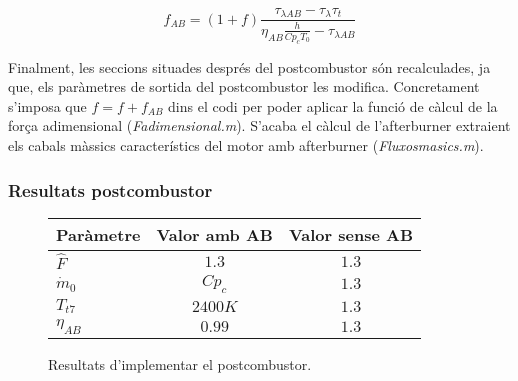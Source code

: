 \begin{equation}
	f_{AB}=(1+f)\frac{\tau_{\lambda AB}-\tau_{\lambda}\tau_t}{\eta_{AB}\frac{h}{Cp_cT_0}-\tau_{\lambda AB}}
\end{equation}
 
 
\noindent Finalment, les seccions situades després del postcombustor són recalculades, ja que, els paràmetres de sortida del postcombustor les modifica. Concretament s'imposa que $f = f +f_{AB}$ dins el codi per poder aplicar la funció de càlcul de la força adimensional (\textit{Fadimensional.m}). S'acaba el càlcul de l'afterburner extraient els cabals màssics característics del motor amb afterburner (\textit{Fluxosmasics.m}).

\subsubsection{Resultats postcombustor}
\begin{figure}[H]
	\centering
	\begin{tabular}{lcc}
		\toprule[3pt]
		\textbf{Paràmetre}&\textbf{Valor amb AB}&\textbf{Valor sense AB}\\
		\midrule[1pt]
		$\hat{F}$ & $1.3$ & $1.3$\\
		$ \dot{m}_0$ & $Cp_c$ & $1.3$\\
		$T_{t7}$ & $2400K$ & $1.3$\\
		$\eta_{AB}$ & $0.99$ & $1.3$\\
		
		\bottomrule[2pt]
	\end{tabular}
	\label{ABres}
	\caption{Resultats d'implementar el postcombustor.}
\end{figure}


\clearpage

